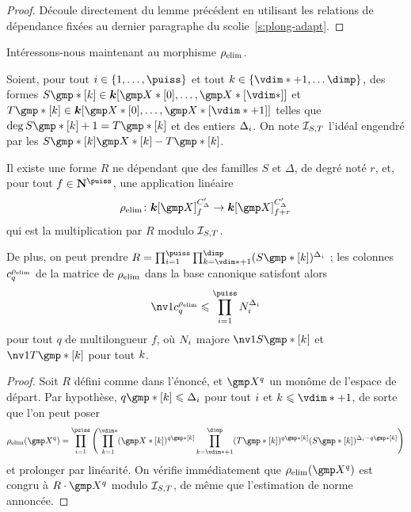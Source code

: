 \begin{proof}
  Découle directement du lemme précédent en utilisant les relations de
  dépendance fixées au dernier paragraphe du scolie~\ref{s:plong-adapt}.
\end{proof}

Intéressons-nous maintenant au morphisme \( \rho\sb{\mathrm{elim}} \).

\begin{lem}
  Soient, pour tout \( \fct \in \{ 1, \dots, \puiss \} \) et tout \( \ind \in
  \{ \vdim* + 1, \dots \dimp \} \), des formes
  \( S\mexp*[\ind] \in \cdn [ \vmp*[0], \dots, \vmp*[\vdim*] ] \) et
  \( T\mexp*[\ind] \in \cdn [ \vmp*[0], \dots, \vmp*[\vdim*+1] ] \)
  telles que \( \deg S\mexp*[\ind] + 1 = T\mexp*[\ind] \) et des entiers
  \( \Delta_i \). On note \( \mathcal I_{S, T} \) l'idéal engendré par les
  \( S\mexp*[\ind] \vmp*[\ind] - T\mexp*[\ind] \).

  Il existe une forme \( R \) ne dépendant que des familles \( S \) et \(
  \Delta \), de degré noté \( r \), et, pour tout \( f \in \N^\puiss \), une
  application linéaire
  \begin{equation}
    \relim \colon
    \cdn [\vmp]_ {f}^{C'_\Delta}
    \to
    \cdn [\vmp]_ {f+r}^{C'_\Delta}
  \end{equation}
  qui est la multiplication par \( R \) modulo \( \mathcal I_{S, T} \).

  De plus, on peut prendre
  \( R = \prod\fctrange \prod_{\ind = \vdim*+1}^{\dimp}
    ( S\mexp*[\ind] )^{\Delta_\fct} \) ; les colonnes \( c_q^{\rho\sb{\mathrm{elim}}} \) de la
  matrice de \( \rho\sb{\mathrm{elim}} \) dans la base canonique satisfont alors
  \begin{equation}
    \nv1{ c_q^{\relim} }
    \le
    \prod\fctrange N_\fct^{\Delta_\fct}
  \end{equation}
  pour tout \( q \) de multilongueur \( f \), où \( N_i \) majore
  \( \nv1{ S\mexp*[\ind] } \) et \( \nv1{ T\mexp*[\ind] } \) pour tout
  \( k \).
\end{lem}

\begin{proof}
  Soit \( R \) défini comme dans l'énoncé, et \( \vmp^q \) un monôme de
  l'espace de départ. Par hypothèse, \( q\mexp*[\ind] \le \Delta_\fct \) pour
  tout \( i \) et \( \ind \le \vdim* + 1 \), de sorte que l'on peut poser
  \begin{equation}
    \relim( \vmp^q )
    =
    \prod\fctrange \left(
    \prod_{\ind=1}^{\vdim*}
    (\vmp*[\ind])^{q\mexp*[\ind]}
    \prod_{\ind=\vdim*+1}^\dimp
    (T\mexp*[\ind])^{q\mexp*[\ind]}
    (S\mexp*[\ind])^{\Delta_\fct - q\mexp*[\ind]}
    \right)
  \end{equation}
  et prolonger par linéarité. On vérifie immédiatement que \( \relim(\vmp^q)
  \) est congru à \( R \cdot \vmp^q \) modulo \( \mathcal I_{S, T} \), de même
  que l'estimation de norme annoncée.
\end{proof}

